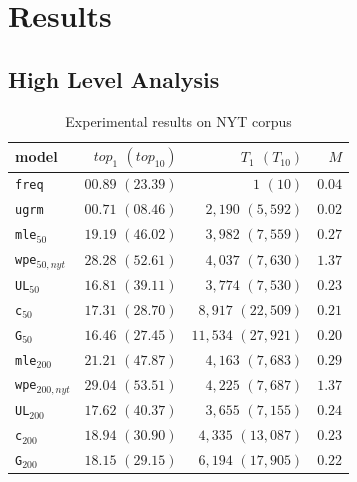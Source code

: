 \documentclass[11pt,a4paper]{article}
\begin{document}
\section{Results}\label{sec:results}


\subsection{High Level Analysis}\label{high_ana}
\begin{table}[h]
\begin{center}
\begin{tabular}{lrrr}
model &  $top_{1}$ $(top_{10})$ & $T_{1}$ $(T_{10})$ & $M$ \\ \hline
\texttt{freq} & $00.89$ $(23.39)$ & $1$ $(10)$  &  $0.04$\\
\texttt{ugrm} & $00.71$ $(08.46)$ & $2,190$ $(5,592)$ & $0.02$ \\
\addlinespace[1ex]

{\tt mle}$_{50}$ & $19.19$ $(46.02)$ & $3,982$ $(7,559)$ & $0.27$  \\
{\tt wpe}$_{50,nyt}$ & $28.28$ $(52.61)$ & $4,037$ $(7,630)$ & $1.37$ \\

{\tt UL}$_{50}$ & $16.81$ $(39.11)$ & $3,774$ $(7,530)$ & $0.23$  \\
{\tt c}$_{50}$ & $17.31$ $(28.70)$ & $8,917$ $(22,509)$&  $0.21$  \\
{\tt G}$_{50}$ & $16.46$ $(27.45)$ & $11,534$ $(27,921)$ & $0.20$   \\
\addlinespace[1ex]

{\tt mle}$_{200}$ & $21.21$ $(47.87)$ & $4,163$ $(7,683)$ & $0.29$ \\
{\tt wpe}$_{200,nyt}$ & $29.04$ $(53.51)$ & $4,225$ $(7,687)$ & $1.37$ \\
{\tt UL}$_{200}$ & $17.62$ $(40.37)$ & $3,655$ $(7,155)$ & $0.24$  \\
{\tt c}$_{200}$ & $18.94$ $(30.90)$ & $4,335$ $(13,087)$ & $0.23$  \\
{\tt G}$_{200}$ & $18.15$ $(29.15)$ &  $6,194$ $(17,905)$ & $0.22$  \\ 
\end{tabular}
\end{center}
\vspace{-0.1in}
\caption{\label{nyt} Experimental results on NYT corpus}
\vspace{-0.1in}
\end{table}
\end{document}
